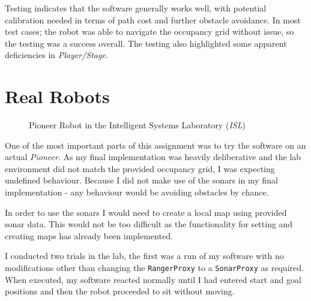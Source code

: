 \documentclass[a4paper,12pt]{article}
\begin{document}
Testing indicates that the software generally works well, with potential calibration needed in terms of path cost and further obstacle avoidance. In most test cases; the robot was able to navigate the occupancy grid without issue, so the testing was a success overall. The testing also highlighted some apparent deficiencies in \textit{Player/Stage}.

\section{Real Robots}
\begin{figure}[h!]
\begin{center}
    \caption{Pioneer Robot in the Intelligent Systems Laboratory (\textit{ISL})}
\end{center}
\end{figure}
One of the most important parts of this assignment was to try the software on an actual \textit{Pioneer}. As my final implementation was heavily deliberative and the lab environment did not match the provided occupancy grid, I was expecting undefined behaviour. Because I did not make use of the sonars in my final implementation - any behaviour would be avoiding obstacles by chance.

In order to use the sonars I would need to create a local map using provided sonar data. This would not be too difficult as the functionality for setting and creating maps has already been implemented.

I conducted two trials in the lab, the first was a run of my software with no modifications other than changing the \texttt{RangerProxy} to a \texttt{SonarProxy} as required. When executed, my software reacted normally until I had entered start and goal positions and then the robot proceeded to sit without moving. 
\end{document}

